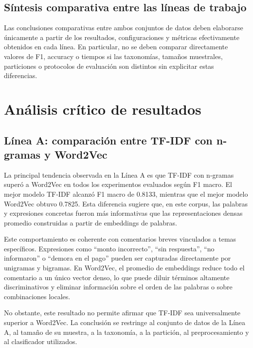\documentclass[12pt,a4paper]{article}
\begin{document}
\subsection{Síntesis comparativa entre las líneas de trabajo}

Las conclusiones comparativas entre ambos conjuntos de datos deben elaborarse únicamente a partir de los resultados, configuraciones y métricas efectivamente obtenidos en cada línea. En particular, no se deben comparar directamente valores de F1, accuracy o tiempos si las taxonomías, tamaños muestrales, particiones o protocolos de evaluación son distintos sin explicitar estas diferencias.


\section{Análisis crítico de resultados}

\subsection{Línea A: comparación entre TF-IDF con n-gramas y Word2Vec}

La principal tendencia observada en la Línea A es que TF-IDF con n-gramas superó a Word2Vec en todos los experimentos evaluados según F1 macro. El mejor modelo TF-IDF alcanzó F1 macro de 0.8133, mientras que el mejor modelo Word2Vec obtuvo 0.7825. Esta diferencia sugiere que, en este corpus, las palabras y expresiones concretas fueron más informativas que las representaciones densas promedio construidas a partir de embeddings de palabras.

Este comportamiento es coherente con comentarios breves vinculados a temas específicos. Expresiones como ``monto incorrecto'', ``sin respuesta'', ``no informaron'' o ``demora en el pago'' pueden ser capturadas directamente por unigramas y bigramas. En Word2Vec, el promedio de embeddings reduce todo el comentario a un único vector denso, lo que puede diluir términos altamente discriminativos y eliminar información sobre el orden de las palabras o sobre combinaciones locales.

No obstante, este resultado no permite afirmar que TF-IDF sea universalmente superior a Word2Vec. La conclusión se restringe al conjunto de datos de la Línea A, al tamaño de su muestra, a la taxonomía, a la partición, al preprocesamiento y al clasificador utilizados.
\end{document}
